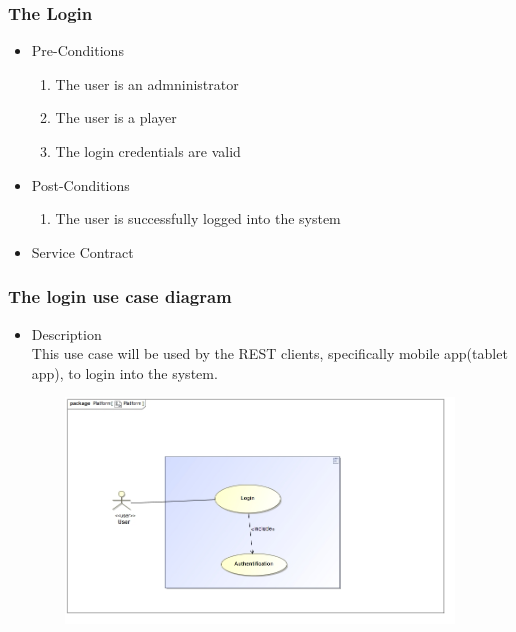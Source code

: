 \documentclass[english]{article}
\begin{document}
		\subsubsection{The Login}
		\begin{itemize}
	
		
		\item Pre-Conditions
			\begin{enumerate}
				\item The user is an admninistrator
				\item The user is a player
				\item The login credentials are valid
			\end{enumerate}
		\item Post-Conditions
			\begin{enumerate}
			\item The user is successfully logged into the system
						
			\end{enumerate}
		\item Service Contract
			\begin{figure}
			
			\end{figure}

\end{itemize}

		\subsubsection* {The login use case diagram}
		\begin{itemize}
			\item Description\\
			This use case will be used by the REST clients, specifically mobile app(tablet app), to login into the system.
		\end{itemize}
		\includegraphics[width=14cm,height=6cm,keepaspectratio]{login.jpg}\\
		
\end{document}
